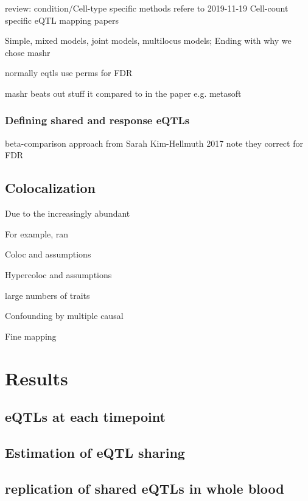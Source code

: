 review: condition/Cell-type specific methods
refere to 2019-11-19 Cell-count specific eQTL mapping papers

Simple, mixed models, joint models, multilocus models; Ending with why we chose mashr

normally eqtls use perms for FDR

mashr beats out stuff it compared to in the paper e.g. metasoft

\subsubsection{Defining shared and response eQTLs}

beta-comparison approach from Sarah Kim-Hellmuth 2017
    note they correct for FDR

\subsection{Colocalization}



Due to the increasingly abundant

For example, ran 

Coloc and assumptions

Hypercoloc and assumptions

large numbers of traits

Confounding by multiple causal

Fine mapping

\section{Results}

\subsection{eQTLs at each timepoint}


\subsection{Estimation of eQTL sharing}


\subsection{replication of shared eQTLs in whole blood}

